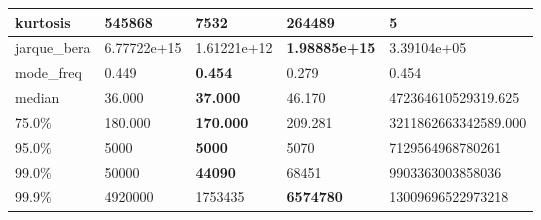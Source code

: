 \begin{table}[H]
\begin{tabular}{|l|m{10em}|m{10em}|m{10em}|m{10em}|}
\hline kurtosis & 545868 & 7532 & \bfseries 264489 & \cellcolor[rgb]{0.9, 0.54, 0.52} 5 \\
\hline jarque\_bera & 6.77722e+15 & 1.61221e+12 & \bfseries 1.98885e+15 & \cellcolor[rgb]{0.9, 0.54, 0.52} 3.39104e+05 \\
\hline mode\_freq & 0.449 & \bfseries 0.454 & \cellcolor[rgb]{0.9, 0.54, 0.52} 0.279 & 0.454 \\
\hline median & 36.000 & \bfseries 37.000 & 46.170 & \cellcolor[rgb]{0.9, 0.54, 0.52} 472364610529319.625 \\
\hline 75.0\% & 180.000 & \bfseries 170.000 & 209.281 & \cellcolor[rgb]{0.9, 0.54, 0.52} 3211862663342589.000 \\
\hline 95.0\% & 5000 & \bfseries 5000 & 5070 & \cellcolor[rgb]{0.9, 0.54, 0.52} 7129564968780261 \\
\hline 99.0\% & 50000 & \bfseries 44090 & 68451 & \cellcolor[rgb]{0.9, 0.54, 0.52} 9903363003858036 \\
\hline 99.9\% & 4920000 & 1753435 & \bfseries 6574780 & \cellcolor[rgb]{0.9, 0.54, 0.52} 13009696522973218 \\
\hline
\end{tabular}
\end{table}
